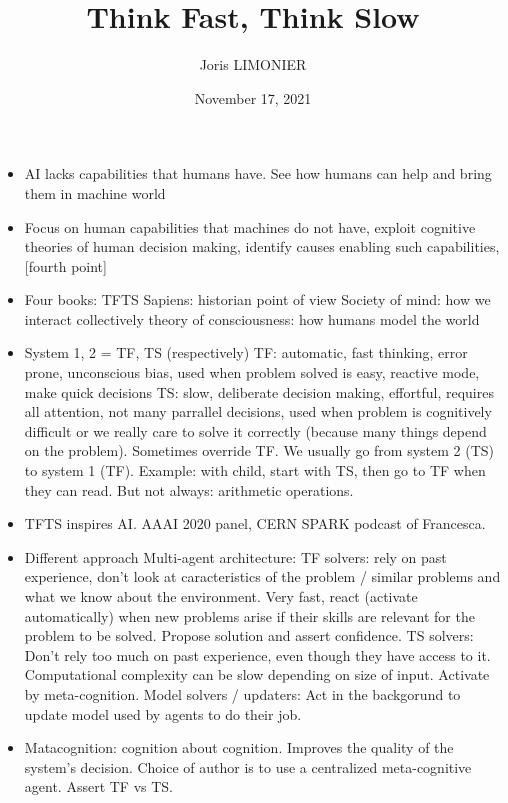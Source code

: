 \documentclass{article}
\title{Think Fast, Think Slow}
\author{Joris LIMONIER}
\date{November 17, 2021}
\begin{document}
\maketitle

\begin{itemize}
  \item AI lacks capabilities that humans have. See how humans can help and bring them in machine world
  \item Focus on human capabilities that machines do not have, exploit cognitive theories of human decision making, identify causes enabling such capabilities, [fourth point]
  \item Four books:
        \subitem TFTS
        \subitem Sapiens: historian point of view
        \subitem Society of mind: how we interact collectively
        \subitem theory of consciousness: how humans model the world
  \item System 1, 2 = TF, TS (respectively)
        \subitem TF: automatic, fast thinking, error prone, unconscious bias, used when problem solved is easy, reactive mode, make quick decisions
        \subitem TS: slow, deliberate decision making, effortful, requires all attention, not many parrallel decisions, used when problem is cognitively difficult or we really care to solve it correctly (because many things depend on the problem). Sometimes override TF.
        \subitem We usually go from system 2 (TS) to system 1 (TF). Example: with child, start with TS, then go to TF when they can read. But not always: arithmetic operations.
  \item TFTS inspires AI. AAAI 2020 panel, CERN SPARK podcast of Francesca.
  \item Different approach
        \subitem Multi-agent architecture:
        \subsubitem TF solvers: rely on past experience, don't look at caracteristics of the problem / similar problems and what we know about the environment. Very fast, react (activate automatically) when new problems arise if their skills are relevant for the problem to be solved. Propose solution and assert confidence.
        \subsubitem TS solvers: Don't rely too much on past experience, even though they have access to it. Computational complexity can be slow depending on size of input. Activate by meta-cognition.
        \subsubitem Model solvers / updaters: Act in the backgorund to update model used by agents to do their job.
  \item Matacognition: cognition about cognition. Improves the quality of the system's decision. Choice of author is to use a centralized meta-cognitive agent. Assert TF vs TS.

\end{itemize}
\end{document}
